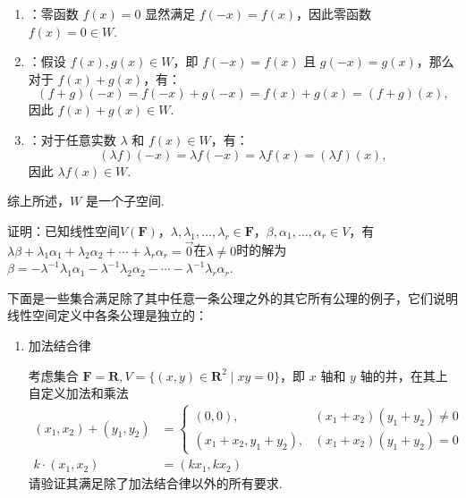 \begin{exercise}
\begin{exgroup}
\begin{answer}
\begin{enumerate}
                \begin{enumerate}
                    \item {}：零函数 $f(x) = 0$ 显然满足 $f(-x) = f(x)$，因此零函数 $f(x) = 0 \in W$.
                    \item {}：假设 $f(x), g(x) \in W$，即 $f(-x) = f(x)$ 且 $g(-x) = g(x)$，那么对于 $f(x) + g(x)$，有：
                    \[
                    (f + g)(-x) = f(-x) + g(-x) = f(x) + g(x) = (f + g)(x),
                    \]
                    因此 $f(x) + g(x) \in W$.
                    \item {}：对于任意实数 $\lambda$ 和 $f(x) \in W$，有：
                    \[
                    (\lambda f)(-x) = \lambda f(-x) = \lambda f(x) = (\lambda f)(x),
                    \]
                    因此 $\lambda f(x) \in W$.
                \end{enumerate}
                综上所述，$W$ 是一个子空间.

            \end{enumerate}
        \end{answer}
    \end{exgroup}

    \begin{exgroup}
        \item 证明：已知线性空间$V(\mathbf{F})$，$\lambda,\lambda_1,\ldots,\lambda_r\in\mathbf{F}$，$\beta,\alpha_1,\ldots,\alpha_r\in V$，有$\lambda\beta+\lambda_1\alpha_1+\lambda_2\alpha_2+\cdots+\lambda_r\alpha_r=\vec{0}$在$\lambda\neq 0$时的解为$\beta=-\lambda^{-1}\lambda_1\alpha_1-\lambda^{-1}\lambda_2\alpha_2-\cdots-\lambda^{-1}\lambda_r\alpha_r$.

        \item \label{item:2:去除一条线性空间公理}
        下面是一些集合满足除了其中任意一条公理之外的其它所有公理的例子，它们说明线性空间定义中各条公理是独立的：
        \begin{enumerate}
            \item 加法结合律

            考虑集合 $\mathbf{F} = \mathbf{R}, V = \{(x, y)\in\mathbf{R}^2 \mid xy = 0\}$，即 $x$ 轴和 $y$ 轴的并，在其上自定义加法和乘法
            \begin{align*}
                (x_1, x_2) + (y_1, y_2) &= \begin{cases}
                    (0, 0), & (x_1+x_2)(y_1+y_2) \neq 0 \\
                    (x_1+x_2, y_1+y_2), & (x_1+x_2)(y_1+y_2) = 0
                \end{cases} \\
                k\cdot (x_1, x_2) &= (k x_1, k x_2)
            \end{align*}
            请验证其满足除了加法结合律以外的所有要求.


\end{enumerate}
\end{exgroup}
\end{exercise}
